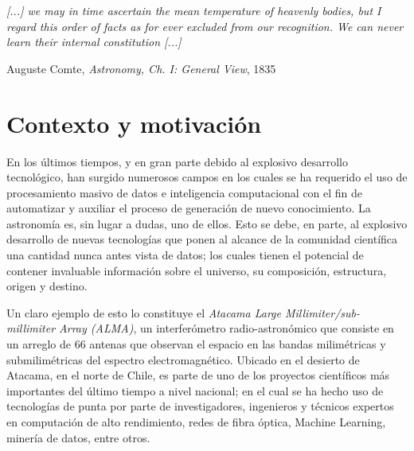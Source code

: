 \begin{intro}


\vspace{1em}
\hfill{}
\begin{minipage}{9cm}{
\begin{spacing}{0.9}
\small
\noindent
\textit{[...] we may in time ascertain the mean temperature of heavenly bodies, but I regard this order of facts as for ever excluded from our recognition. We can never learn their internal constitution [...]}
\end{spacing}
\vspace{1em}
\hfill{}{Auguste Comte, \textit{Astronomy, Ch. I: General View}, 1835}
}
\vspace{2em}
\end{minipage}

\section*{Contexto y motivación}

En los últimos tiempos, y en gran parte debido al explosivo desarrollo tecnológico, han surgido numerosos campos en los cuales se ha requerido el uso de procesamiento masivo de datos e inteligencia computacional con el fin de automatizar y auxiliar el proceso de generación de nuevo conocimiento. La astronomía es, sin lugar a dudas, uno de ellos. Esto se debe, en parte, al explosivo desarrollo de nuevas tecnologías que ponen al alcance de la comunidad científica una cantidad nunca antes vista de datos; los cuales tienen el potencial de contener invaluable información sobre el universo, su composición, estructura, origen y destino.

Un claro ejemplo de esto lo constituye el \textit{Atacama Large Millimiter/sub-millimiter Array (ALMA)}, un interferómetro radio-astronómico que consiste en un arreglo de 66 antenas que observan el espacio en las bandas milimétricas y submilimétricas del espectro electromagnético. Ubicado en el desierto de Atacama, en el norte de Chile, es parte de uno de los proyectos científicos más importantes del último tiempo a nivel nacional; en el cual se ha hecho uso de tecnologías de punta por parte de investigadores, ingenieros y técnicos expertos en computación de alto rendimiento, redes de fibra óptica, Machine Learning, minería de datos, entre otros. 


\end{intro}

